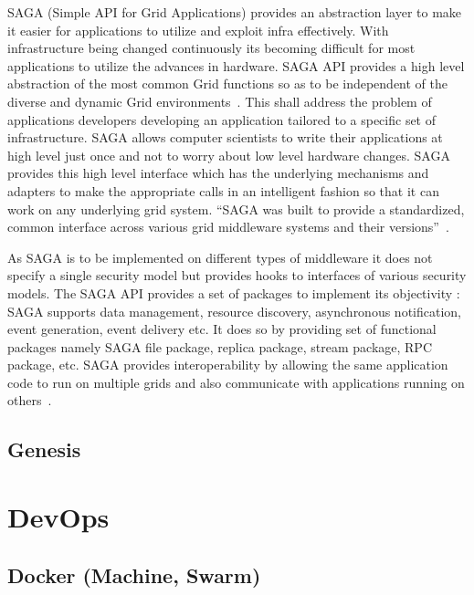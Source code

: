 {SAGA (Simple API for Grid Applications) provides an abstraction layer
to make it easier for applications to utilize and exploit infra
effectively. With infrastructure being changed continuously its
becoming difficult for most applications to utilize the advances in
hardware. SAGA API provides a high level abstraction of the most
common Grid functions so as to be independent of the diverse and
dynamic Grid environments~\cite{saga-paper}. This shall address the
problem of applications developers developing an application tailored
to a specific set of infrastructure.  SAGA allows computer scientists
to write their applications at high level just once and not to worry
about low level hardware changes. SAGA provides this high level
interface which has the underlying mechanisms and adapters to make the
appropriate calls in an intelligent fashion so that it can work on any
underlying grid system. ``SAGA was built to provide a standardized,
common interface across various grid middleware systems and their
versions''~\cite{www-saga-ogf-document}.

As SAGA is to be implemented on different types of middleware it does
not specify a single security model but provides hooks to interfaces
of various security models. The SAGA API provides a set of packages to
implement its objectivity : SAGA supports data management, resource
discovery, asynchronous notification, event generation, event delivery
etc. It does so by providing set of functional packages namely SAGA
file package, replica package, stream package, RPC package, etc. SAGA
provides interoperability by allowing the same application code to run
on multiple grids and also communicate with applications running on
others~\cite{saga-paper}.

\subsection{Genesis}

\section{DevOps}
\label{S:o-DevOps}

\subsection{Docker (Machine, Swarm)}

}
